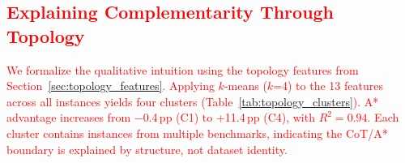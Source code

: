 \documentclass[11pt]{article}
\begin{document}
\textcolor{red}{\subsection{Explaining Complementarity Through Topology}
\label{sec:topology_clusters}}

\textcolor{red}{We formalize the qualitative intuition using the topology features from Section~\ref{sec:topology_features}. Applying $k$-means ($k$=4) to the 13 features across all instances yields four clusters (Table~\ref{tab:topology_clusters}). A* advantage increases from $-$0.4\,pp (C1) to +11.4\,pp (C4), with $R^2 = 0.94$. Each cluster contains instances from multiple benchmarks, indicating the CoT/A* boundary is explained by structure, not dataset identity.}

\begin{table}[t]
\centering
\small
{}
\caption{\textcolor{red}{Reasoning topology clusters. BC = branching coefficient. A* advantage grows monotonically with branching complexity.}}
\label{tab:topology_clusters}
\end{table}
\end{document}
